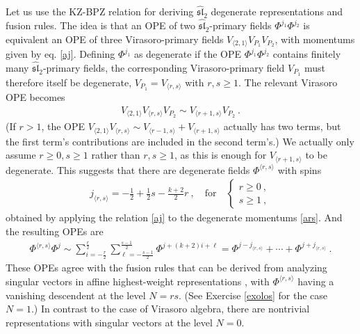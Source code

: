 \documentclass[12pt, a4paper, notitlepage, twoside]{report}
\numberwithin{equation}{section}
\theoremstyle{break}
\begin{document}
Let us use the KZ-BPZ relation for deriving $\widehat{\mathfrak{sl}}_2$ degenerate representations and fusion rules. 
The idea is that an OPE of two $\widehat{\mathfrak{sl}}_2$-primary fields $\Phi^{j_1}\Phi^{j_2}$ is equivalent an OPE of three Virasoro-primary fields $V_{\langle 2, 1\rangle}V_{P_1}V_{P_2}$, with momentums given by eq. \eqref{aj}.
Defining $\Phi^{j_1}$ as degenerate if the OPE $\Phi^{j_1}\Phi^{j_2}$ contains finitely many $\widehat{\mathfrak{sl}}_2$-primary fields, the corresponding Virasoro-primary field $V_{P_1}$ must therefore itself be degenerate, $V_{P_1}=V_{\langle r, s\rangle}$ with $r,s\geq 1$. 
The relevant Virasoro OPE becomes 
\begin{align}
 V_{\langle 2, 1\rangle}V_{\langle r, s\rangle}V_{P_2} \sim V_{\langle r+1, s\rangle}V_{P_2}\ .
\end{align}
(If $r>1$, the OPE $V_{\langle 2, 1\rangle}V_{\langle r, s\rangle}\sim V_{\langle r-1, s\rangle}+ V_{\langle r+1, s\rangle}$ actually has two terms, but the first term's contributions are included in the second term's.)
We actually only assume $r\geq 0,s\geq 1$ rather than $r,s\geq 1$, as this is enough for $V_{\langle r+1, s\rangle}$ to be degenerate.
This suggests that there are degenerate fields $\Phi^{\langle r,s\rangle}$ with spins
\begin{align}
 j_{\langle r,s\rangle} = -\frac12 +\frac12 s -\frac{k+2}{2} r \ , \quad \text{for} \quad \left\{\begin{array}{l} r\geq 0\ , \\ s\geq 1\ , \end{array}\right.
 \label{jrs}
\end{align}
obtained by applying the relation \eqref{aj} to the degenerate momentums \eqref{ars}. And the resulting OPEs are
\begin{align}
 \Phi^{\langle r, s\rangle}\Phi^j \sim 
 \sum_{i=-\frac{r}{2}}^\frac{r}{2} \sum_{\ell=-\frac{s-1}{2}}^{\frac{s-1}{2}} \Phi^{j+(k+2)i+\ell}
 = \Phi^{j-j_{\langle r,s\rangle}} + \cdots + \Phi^{j+j_{\langle r,s\rangle}}\ .
 \label{prspj}
\end{align}
These OPEs agree with the fusion rules that can be derived from analyzing singular vectors in affine highest-weight representations \cite{ay92}, with $\Phi^{\langle r, s\rangle}$ having a vanishing descendent at the level $N=rs$. (See Exercise \ref{exolos} for the case $N=1$.) In contrast to the case of Virasoro algebra, there are nontrivial representations with singular vectors at the level $N=0$.
\end{document}
